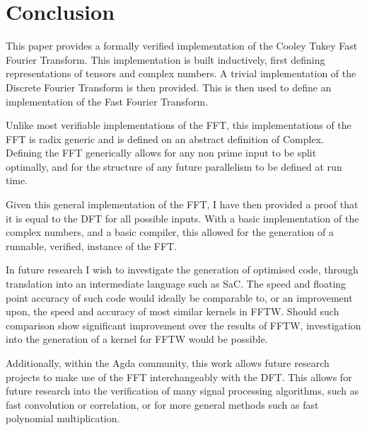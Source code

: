 \section{Conclusion}
This paper provides a formally verified implementation of the Cooley Tukey Fast 
Fourier Transform.
This implementation is built inductively, first defining representations of
tensors and complex numbers.
A trivial implementation of the Discrete Fourier Transform is then provided.
This is then used to define an implementation of the Fast Fourier Transform.

Unlike most verifiable implementations of the FFT, this implementations of the
FFT is radix generic and is defined on an abstract definition of Complex.
Defining the FFT generically allows for any non prime input
to be split optimally, and for the structure of any future parallelism to be 
defined at run time.

Given this general implementation of the FFT, I have then provided a proof that
it is equal to the DFT for all possible inputs.
With a basic implementation of the complex numbers, and a basic compiler,
this allowed for the generation of a runnable, verified, instance of the FFT.

In future research I wish to investigate the generation of optimised code, 
through translation into an intermediate language such as SaC.
The speed and floating point accuracy of such code would ideally be 
comparable to, or an improvement upon, the speed and accuracy of most similar
kernels in FFTW.
Should such comparison show significant improvement over the results of FFTW,
investigation into the generation of a kernel for FFTW would be possible.

Additionally, within the Agda community, this work allows future research 
projects to make use of the FFT interchangeably with the DFT.
This allows for future research into the verification of many signal processing 
algorithms, such as fast convolution or correlation, or for more general 
methods such as fast polynomial multiplication.

